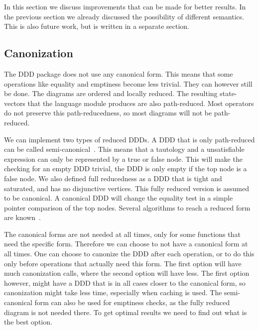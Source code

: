 In this section we discuss improvements that can be made for better results. In the previous section we already discussed the possibility of different semantics. This is also future work, but is written in a separate section.

\subsection{Canonization}
The DDD package does not use any canonical form. This means that some operations like equality and emptiness become less trivial. They can however still be done. The diagrams are ordered and locally reduced. The resulting state-vectors that the language module produces are also path-reduced. Most operators do not preserve this path-reducedness, so most diagrams will not be path-reduced. 

We can implement two types of reduced DDDs. A DDD that is only path-reduced can be called semi-canonical~\cite{ddds}. This means that a tautology and a unsatisfiable expression can only be represented by a true or false node. This will make the checking for an empty DDD trivial, the DDD is only empty if the top node is a false node. We also defined full reducedness as a DDD that is tight and saturated, and has no disjunctive vertices. This fully reduced version is assumed to be canonical. A canonical DDD will change the equality test in a simple pointer comparison of the top nodes.
Several algorithms to reach a reduced form are known~\cite{ddd-mt-98}.

The canonical forms are not needed at all times, only for some functions that need the specific form. Therefore we can choose to not have a canonical form at all times. One can choose to canonize the DDD after each operation, or to do this only before operations that actually need this form. The first option will have much canonization calls, where the second option will have less. The first option however, might have a DDD that is in all cases closer to the canonical form, so canonization might take less time, especially when caching is used. The semi-canonical form can also be used for emptiness checks, as the fully reduced diagram is not needed there. To get optimal results we need to find out what is the best option.

